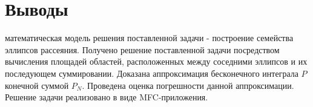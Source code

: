 \section{Выводы}
 математическая модель решения поставленной задачи - построение семейства эллипсов рассеяния. Получено решение поставленной задачи посредством вычисления площадей областей, расположенных между соседними эллипсов и их последующем суммировании. Доказана аппроксимация бесконечного интеграла $P$ конечной суммой $P_N$. Проведена оценка погрешности данной аппроксимации. Решение задачи реализовано в виде MFC-приложения.